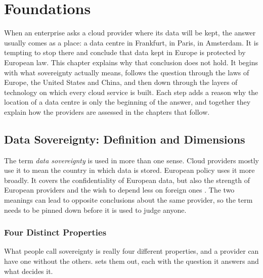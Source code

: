 \chapter{Foundations}
\label{ch:foundations}

When an enterprise asks a cloud provider where its data will be kept, the answer
usually comes as a place: a data centre in Frankfurt, in Paris, in Amsterdam. It
is tempting to stop there and conclude that data kept in Europe is protected by
European law. This chapter explains why that conclusion does not hold. It begins
with what sovereignty actually means, follows the question through the laws of
Europe, the United States and China, and then down through the layers of
technology on which every cloud service is built. Each step adds a reason why the
location of a data centre is only the beginning of the answer, and together they
explain how the providers are assessed in the chapters that follow.

\section{Data Sovereignty: Definition and Dimensions}
\label{sec:sovereignty-definition}

The term \emph{data sovereignty} is used in more than one sense. Cloud providers
mostly use it to mean the country in which data is stored. European policy uses it
more broadly. It covers the confidentiality of European data, but also the
strength of European providers and the wish to depend less on foreign ones
\cite{Blancato_CloudSovereigntyNexus_2024}. The two meanings can lead to opposite
conclusions about the same provider, so the term needs to be pinned down before it
is used to judge anyone.

\subsection{Four Distinct Properties}
\label{subsec:four-properties}

What people call sovereignty is really four different properties, and a provider
can have one without the others.  sets them out,
each with the question it answers and what decides it.


